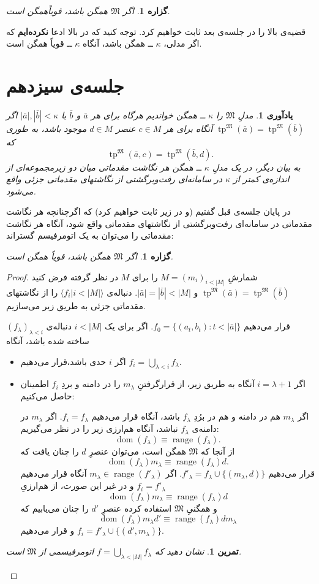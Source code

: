 \documentclass[12pt,a4paper]{report}
\theoremstyle{colorhead}
\newtheorem{tam}[thm]{تمرین}
\newtheorem{prop}[thm]{گزاره}
\newtheorem{yad}[thm]{یادآوری}
\DeclareMathOperator{\dom}{dom}
\DeclareMathOperator{\range}{range}
\DeclareMathOperator{\tp}{tp}
\begin{document}
\begin{prop}
اگر
$\mathfrak{M}$
همگن باشد، قویاًهمگن است.
\end{prop}
قضیه‌ی بالا را در جلسه‌ی بعد ثابت خواهیم کرد. توجه کنید که در بالا ادعا\textbf{ نکرده‌ایم} که اگر
مدلی،
$\kappa$ ــ
همگن باشد، آنگاه
$\kappa$ 
ــ 
قویاً همگن است. 
\newpage
\section{جلسه‌ی سیزدهم}
\begin{yad}
مدلِ
$\mathfrak{M}$
را
$\kappa$
ــ
همگن خواندیم هرگاه برای هر
$\bar{a}$
و
$\bar{b}$
با
$|\bar{a}|, |\bar{b}|<\kappa$
اگر
\mbox{$\tp^\mathfrak{M}(\bar{a})=\tp^\mathfrak{M}(\bar{b})$}
آنگاه برای هر
$c\in M$
عنصر
$d\in M$
موجود باشد، به طوری که
\[\tp^\mathfrak{M}(\bar{a},c)=\tp^\mathfrak{M}(\bar{b},d).\]
به بیان دیگر، در یک مدلِ
$\kappa$
ــ
همگن هر نگاشت مقدماتی میان دو زیرمجموعه‌ای از اندازه‌ی کمتر از
$\kappa$
در سامانه‌ای رفت‌وبرگشتی  از نگاشتهای مقدماتی جزئی واقع می‌شود.
\end{yad}
در پایان جلسه‌ی قبل گفتیم (و در زیر ثابت خواهیم کرد)‌ که اگرچنانچه هر نگاشت مقدماتی
در سامانه‌ای رفت‌وبرگشتی از نگاشتهای مقدماتی واقع شود، آنگاه هر نگاشت مقدماتی را می‌توان به یک اتومرفیسم گستراند:
\begin{prop}
اگر
$\mathfrak{M}$
همگن باشد، قویاً همگن است.
\end{prop}
\begin{proof}
شمارشِ
$M=(m_i)_{i< |M|}$
را برای 
$M$
در نظر گرفته فرض کنید
$\tp^\mathfrak{M}(\bar{a})=\tp^\mathfrak{M}(\bar{b})$
و
$|\bar{a}|=|\bar{b}|<|M|$.
دنباله‌ی
$\langle f_i|i<|M|\rangle$
را
از نگاشتهای مقدماتی جزئی  به طریق زیر می‌سازیم. 
\par 
قرار می‌دهیم
$f_0=\{(a_t,b_t):{t<|\bar{a}|}\}$.
اگر
برای یک
$i<|M|$
دنباله‌ی
$(f_\lambda)_{\lambda<i}$
ساخته شده باشد، آنگاه
\begin{itemize}
\item 
 اگر
 $i$
 حدی باشد،‌قرار می‌دهیم
 $f_i=\bigcup_{\lambda<i} f_\lambda$.
 \item 
 اگر
 $i=\lambda+1$
 آنگاه
 به طریق زیر، از قرارگرفتنِ
 $m_\lambda$
 را در دامنه و 
 بردِ
 $f_i$
 اطمینان حاصل می‌کنیم:
 \par 
اگر
 $m_\lambda$
 هم در دامنه و هم در برُدِ
 $f_\lambda$
 باشد،
 آنگاه قرار می‌دهیم 
 $f_{i}=f_\lambda$.
 اگر
 $m_\lambda$
 در دامنه‌ی
 $f_\lambda$
 نباشد، آنگاه هم‌ارزی زیر را در نظر می‌گیریم:
 \[
 \dom(f_\lambda)\equiv \range (f_\lambda).
 \]
 از آنجا که
 $\mathfrak{M}$
 همگن است، می‌توان عنصرِ
 $d$
 را چنان یافت که
 \[
 \dom(f_\lambda)m_\lambda\equiv \range (f_\lambda)d.
 \]
 قرار می‌دهیم
 $f'_\lambda=f_\lambda\cup \{(m_\lambda,d)\}$.
 اگر
 $m_\lambda\in \range (f'_\lambda)$
 آنگاه قرار می‌دهیم
 $f_{i}=f'_\lambda$
 و در غیر این صورت، از هم‌ارزیِ
 \[
 \dom(f_\lambda)m_\lambda\equiv \range (f_\lambda) d
 \]
 و همگنیِ
 $\mathfrak{M}$
 استفاده کرده عنصرِ
 $d'$
 را چنان می‌یابیم که 
 \[
  \dom(f_\lambda)m_\lambda d'\equiv \range (f_\lambda) dm_\lambda
 \]
 و قرار می‌دهیم
 $f_i=f'_\lambda\cup \{(d',m_\lambda)\}$.
\end{itemize}
\begin{tam}
نشان دهید که 
$f=\bigcup_{\lambda<|M|} f_\lambda$
اتومرفیسمی از 
$\mathfrak{M}$
است.
\end{tam}
\end{proof}
\end{document}
